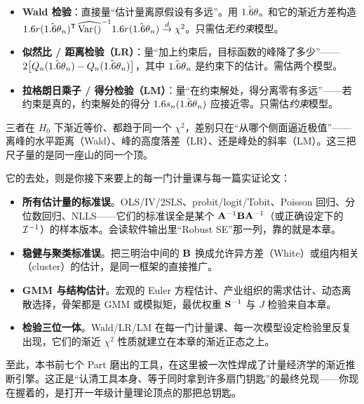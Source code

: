 \begin{itemize}
    \item \textbf{Wald 检验}：直接量``估计量离原假设有多远''。用 $\hat{1.6\theta}_n$ 和它的渐近方差构造 $1.6 r(\hat{1.6\theta}_n)^{\mathsf{T}}\,\widehat{\operatorname{Var}_{}\!\left(\right)}^{-1}1.6 r(\hat{1.6\theta}_n)\overset{d}{\to}\chi^2$。只需估\emph{无约束}模型。
    \item \textbf{似然比 / 距离检验（LR）}：量``加上约束后，目标函数的峰降了多少''——$2\bigl[Q_n(\hat{1.6\theta}_n)-Q_n(\tilde{1.6\theta}_n)\bigr]$，其中 $\tilde{1.6\theta}_n$ 是约束下的估计。需估两个模型。
    \item \textbf{拉格朗日乘子 / 得分检验（LM）}：量``在约束解处，得分离零有多远''——若约束是真的，约束解处的得分 $1.6 s_n(\tilde{1.6\theta}_n)$ 应接近零。只需估\emph{约束}模型。
\end{itemize}

三者在 $H_0$ 下渐近等价、都趋于同一个 $\chi^2$，差别只在``从哪个侧面逼近极值''——离峰的水平距离（Wald）、峰的高度落差（LR）、还是峰处的斜率（LM）。这三把尺子量的是同一座山的同一个顶。


它的去处，则是你接下来要上的每一门计量课与每一篇实证论文：

\begin{itemize}
    \item \textbf{所有估计量的标准误}。OLS/IV/2SLS、probit/logit/Tobit、Poisson 回归、分位数回归、NLLS——它们的标准误全是某个 ${\mathbf{A}}^{-1}\mathbf{B}{\mathbf{A}}^{-1}$（或正确设定下的 ${\mathcal I}^{-1}$）的样本版本。会读软件输出里``Robust SE''那一列，靠的就是本章。
    \item \textbf{稳健与聚类标准误}。把三明治中间的 $\mathbf{B}$ 换成允许异方差（White）或组内相关（cluster）的估计，是同一框架的直接推广。
    \item \textbf{GMM 与结构估计}。宏观的 Euler 方程估计、产业组织的需求估计、动态离散选择，骨架都是 GMM 或模拟矩，最优权重 ${\mathbf{S}}^{-1}$ 与 $J$ 检验来自本章。
    \item \textbf{检验三位一体}。Wald/LR/LM 在每一门计量课、每一次模型设定检验里反复出现，它们的渐近 $\chi^2$ 性质就建立在本章的渐近正态之上。
\end{itemize}

至此，本书前七个 Part 磨出的工具，在这里被一次性焊成了计量经济学的渐近推断引擎。这正是``认清工具本身、等于同时拿到许多扇门钥匙''的最终兑现——你现在握着的，是打开一年级计量理论顶点的那把总钥匙。
